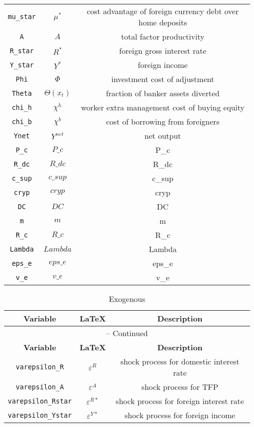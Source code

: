 \begin{center}
\begin{longtable}{ccc}
\texttt{mu\_star} & $\mu^{*}$ & cost advantage of foreign currency debt over home deposits\\
\texttt{A} & $A$ & total factor productivity\\
\texttt{R\_star} & $R^{*}$ & foreign gross interest rate\\
\texttt{Y\_star} & $Y^{*}$ & foreign income\\
\texttt{Phi} & $\Phi$ & investment cost of adjustment\\
\texttt{Theta} & $\Theta(x_{t})$ & fraction of banker assets diverted\\
\texttt{chi\_h} & $\chi^{h}$ & worker extra management cost of buying equity\\
\texttt{chi\_b} & $\chi^{b}$ & cost of borrowing from foreigners\\
\texttt{Ynet} & $Y^{net}$ & net output\\
\texttt{P\_c} & $P\_c$ & P\_c\\
\texttt{R\_dc} & $R\_dc$ & R\_dc\\
\texttt{c\_sup} & $c\_sup$ & c\_sup\\
\texttt{cryp} & $cryp$ & cryp\\
\texttt{DC} & $DC$ & DC\\
\texttt{m} & $m$ & m\\
\texttt{R\_c} & $R\_c$ & R\_c\\
\texttt{Lambda} & $Lambda$ & Lambda\\
\texttt{eps\_e} & $eps\_e$ & eps\_e\\
\texttt{v\_e} & $v\_e$ & v\_e\\
\hline%
\end{longtable}
\end{center}
\begin{center}
\begin{longtable}{ccc}
\caption{Exogenous}\\%
\hline%
\multicolumn{1}{c}{\textbf{Variable}} &
\multicolumn{1}{c}{\textbf{\LaTeX}} &
\multicolumn{1}{c}{\textbf{Description}}\\%
\hline\hline%
\endfirsthead
\multicolumn{3}{c}{{\tablename} \thetable{} -- Continued}\\%
\hline%
\multicolumn{1}{c}{\textbf{Variable}} &
\multicolumn{1}{c}{\textbf{\LaTeX}} &
\multicolumn{1}{c}{\textbf{Description}}\\%
\hline\hline%
\endhead
\texttt{varepsilon\_R} & $\varepsilon^{R}$ & shock process for domestic interest rate\\
\texttt{varepsilon\_A} & $\varepsilon^{A}$ & shock process for TFP\\
\texttt{varepsilon\_Rstar} & $\varepsilon^{R*}$ & shock process for foreign interest rate\\
\texttt{varepsilon\_Ystar} & $\varepsilon^{Y*}$ & shock process for foreign income\\
\hline%
\end{longtable}
\end{center}
